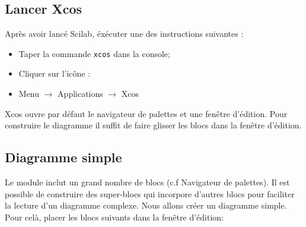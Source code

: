 \subsection{Lancer Xcos}
Après avoir lancé Scilab, éxécuter une des instructions suivantes :
\begin{itemize}
    \item Taper la commande \verb?xcos? dans la console;
    \item Cliquer sur l'icône : 
    \item Menu $\rightarrow$ Applications $\rightarrow$ Xcos
\end{itemize}

Xcos ouvre par défaut le navigateur de palettes et une fenêtre d'édition. 
Pour construire le diagramme il suffit de faire glisser les blocs dans la 
fenêtre d'édition.

\subsection{Diagramme simple}

Le module inclut un grand nombre de blocs (c.f Navigateur de palettes).
Il est possible de construire des super-blocs qui incorpore d'autres blocs pour
faciliter la lecture d'un diagramme complexe. \newline
Nous allons créer un diagramme simple. Pour celà, placer les blocs suivants 
dans la fenêtre d'édition:

